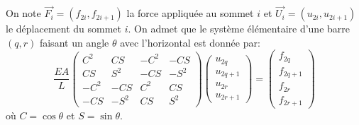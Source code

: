 \documentclass[11pt]{article}
\begin{document}
On note $\overrightarrow{F_i}=(f_{2i},f_{2i+1})$ la force appliquée au sommet $i$ et $\overrightarrow{U_i}=(u_{2i},u_{2i+1})$ le déplacement du sommet $i$.
On admet que le système élémentaire d'une barre $(q,r)$ faisant un angle $\theta$ avec l'horizontal est donnée par:
\[\frac{EA}{L}\left(\begin{array}{rrrr} 
C^2&CS&-C^2&-CS\\
CS&S^2&-CS&-S^2\\
-C^2&-CS&C^2&CS\\
-CS&-S^2&CS&S^2
\end{array}\right)\left(\begin{array}{l} 
u_{2q}\\u_{2q+1}\\u_{2r}\\u_{2r+1}
\end{array}\right) =\left(\begin{array}{l} 
f_{2q}\\f_{2q+1}\\f_{2r}\\f_{2r+1}
\end{array}\right)  \]
où  $C=\cos\theta$ et $S=\sin\theta$.
\end{document}
